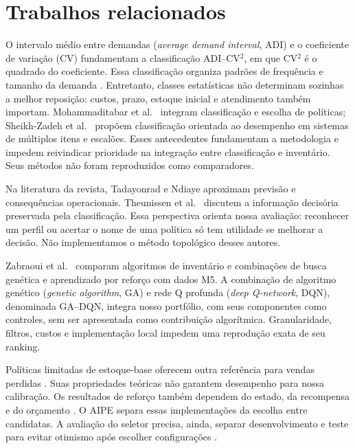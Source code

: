 \documentclass[preprint,12pt]{elsarticle}
\begin{document}
\section{Trabalhos relacionados}
O intervalo médio entre demandas (\textit{average demand interval}, ADI) e o coeficiente de variação (CV) fundamentam a classificação ADI--CV$^2$, em que CV$^2$ é o quadrado do coeficiente. Essa classificação organiza padrões de frequência e tamanho da demanda \cite{syntetos2005}. Entretanto, classes estatísticas não determinam sozinhas a melhor reposição: custos, prazo, estoque inicial e atendimento também importam. Mohammaditabar et al.\ \cite{Mohammaditabar2012Integrated} integram classificação e escolha de políticas; Sheikh-Zadeh et al.\ \cite{SheikhZadeh2021PBIC} propõem classificação orientada ao desempenho em sistemas de múltiplos itens e escalões. Esses antecedentes fundamentam a metodologia e impedem reivindicar prioridade na integração entre classificação e inventário. Seus métodos não foram reproduzidos como comparadores.

Na literatura da revista, Tadayonrad e Ndiaye \cite{sca_f81ad2b3e023} aproximam previsão e consequências operacionais. Theunissen et al.\ \cite{sca_c5c06dcbc9e5} discutem a informação decisória preservada pela classificação. Essa perspectiva orienta nossa avaliação: reconhecer um perfil ou acertar o nome de uma política só tem utilidade se melhorar a decisão. Não implementamos o método topológico desses autores.

Zabraoui et al.\ \cite{sca_27e994c54848} comparam algoritmos de inventário e combinações de busca genética e aprendizado por reforço com dados M5. A combinação de algoritmo genético (\textit{genetic algorithm}, GA) e rede Q profunda (\textit{deep Q-network}, DQN), denominada GA--DQN, integra nosso portfólio, com seus componentes como controles, sem ser apresentada como contribuição algorítmica. Granularidade, filtros, custos e implementação local impedem uma reprodução exata de seu ranking.

Políticas limitadas de estoque-base oferecem outra referência para vendas perdidas \cite{Xin2021CappedBaseStock}. Suas propriedades teóricas não garantem desempenho para nossa calibração. Os resultados de reforço também dependem do estado, da recompensa e do orçamento \cite{Boute2022DRLInventoryRoadmap}. O AIPE separa essas implementações da escolha entre candidatas. A avaliação do seletor precisa, ainda, separar desenvolvimento e teste para evitar otimismo após escolher configurações \cite{CawleyTalbot2010}.
\end{document}
